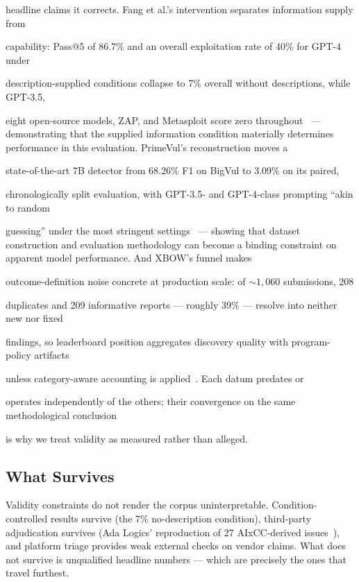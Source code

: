 \documentclass[conference,compsoc]{IEEEtran}
\begin{document}
headline claims it corrects. Fang et al.'s intervention separates information supply from

capability: Pass@5 of 86.7\% and an overall exploitation rate of 40\% for GPT-4 under

description-supplied conditions collapse to 7\% overall without descriptions, while GPT-3.5,

eight open-source models, ZAP, and Metasploit score zero throughout~\cite{fang2024agents} ---
demonstrating that the supplied information condition materially determines performance in
this evaluation. PrimeVul's reconstruction moves a

state-of-the-art 7B detector from 68.26\% F1 on BigVul to 3.09\% on its paired,

chronologically split evaluation, with GPT-3.5- and GPT-4-class prompting ``akin to random

guessing'' under the most stringent settings~\cite{primevul2024} --- showing that dataset
construction and evaluation methodology can become a binding constraint on apparent model
performance. And XBOW's funnel makes

outcome-definition noise concrete at production scale: of ${\sim}1{,}060$ submissions, 208

duplicates and 209 informative reports --- roughly 39\% --- resolve into neither new nor fixed

findings, so leaderboard position aggregates discovery quality with program-policy artifacts

unless category-aware accounting is applied~\cite{xbowtop12025}. Each datum predates or

operates independently of the others; their convergence on the same methodological conclusion

is why we treat validity as measured rather than alleged.

\subsection{What Survives}
Validity constraints do not render the corpus uninterpretable. Condition-controlled results
survive (the 7\% no-description condition), third-party adjudication survives (Ada Logics'
reproduction of 27 AIxCC-derived issues~\cite{openssfaixcc2026}), and platform triage provides
weak external checks on vendor claims. What does not survive is unqualified headline numbers ---
which are precisely the ones that travel furthest.

\end{document}
